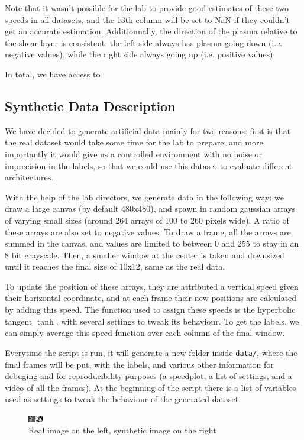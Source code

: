 \documentclass[10pt,conference]{IEEEtran}
\begin{document}
Note that it wasn't possible for the lab to provide good estimates of these two speeds in all datasets, and the 13th column will be set to NaN if they couldn't get an accurate estimation. 
Additionnally, the direction of the plasma relative to the shear layer is consistent: the left side always has plasma going down (i.e. negative values), while the right side always going up (i.e. positive values). \par
In total, we have access to 

\subsection{Synthetic Data Description}
We have decided to generate artificial data mainly for two reasons: first is that the real dataset would take some time for the lab to prepare; and more importantly it would give us a controlled environment with no noise or imprecision in the labels, so that we could use this dataset to evaluate different architectures.\par
With the help of the lab directors, we generate data in the following way: we draw a large canvas (by default 480x480), and spawn in random gaussian arrays of varying small sizes (around 264 arrays of 100 to 260 pixels wide). A ratio of these arrays are also set to negative values. To draw a frame, all the arrays are summed in the canvas, and values are limited to between 0 and 255 to stay in an 8 bit grayscale. Then, a smaller window at the center is taken and downsized until it reaches the final size of 10x12, same as the real data.\par
To update the position of these arrays, they are attributed a vertical speed given their horizontal coordinate, and at each frame their new positions are calculated by adding this speed. The function used to assign these speeds is the hyperbolic tangent $\tanh$, with several settings to tweak its behaviour. To get the labels, we can simply average this speed function over each column of the final window.\par
Everytime the script is run, it will generate a new folder inside \texttt{data/}, where the final frames will be put, with the labels, and various other information for debuging and for reproducibility purposes (a speedplot, a list of settings, and a video of all the frames).
At the beginning of the script there is a list of variables used as settings to tweak the behaviour of the generated dataset.
 
\begin{figure}
  \centering
  \includegraphics[scale=4]{images/comparison.png}
  \caption{Real image on the left, synthetic image on the right}
\end{figure}
 
\end{document}
